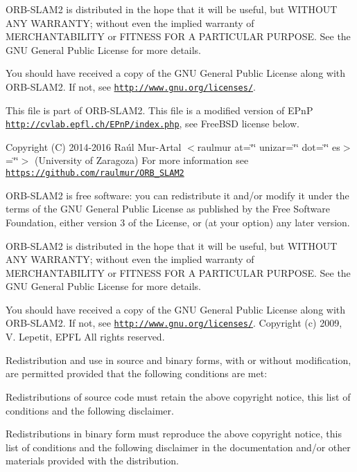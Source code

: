 O\+R\+B-\/\+S\+L\+A\+M2 is distributed in the hope that it will be useful, but W\+I\+T\+H\+O\+UT A\+NY W\+A\+R\+R\+A\+N\+TY; without even the implied warranty of M\+E\+R\+C\+H\+A\+N\+T\+A\+B\+I\+L\+I\+TY or F\+I\+T\+N\+E\+SS F\+OR A P\+A\+R\+T\+I\+C\+U\+L\+AR P\+U\+R\+P\+O\+SE. See the G\+NU General Public License for more details.

You should have received a copy of the G\+NU General Public License along with O\+R\+B-\/\+S\+L\+A\+M2. If not, see \href{http://www.gnu.org/licenses/}{\tt http\+://www.\+gnu.\+org/licenses/}.

This file is part of O\+R\+B-\/\+S\+L\+A\+M2. This file is a modified version of E\+PnP \href{http://cvlab.epfl.ch/EPnP/index.php}{\tt http\+://cvlab.\+epfl.\+ch/\+E\+Pn\+P/index.\+php}, see Free\+B\+SD license below.

Copyright (C) 2014-\/2016 Raúl Mur-\/\+Artal $<$raulmur at=\char`\"{}\char`\"{} unizar=\char`\"{}\char`\"{} dot=\char`\"{}\char`\"{} es$>$=\char`\"{}\char`\"{}$>$ (University of Zaragoza) For more information see \href{https://github.com/raulmur/ORB_SLAM2}{\tt https\+://github.\+com/raulmur/\+O\+R\+B\+\_\+\+S\+L\+A\+M2}

O\+R\+B-\/\+S\+L\+A\+M2 is free software\+: you can redistribute it and/or modify it under the terms of the G\+NU General Public License as published by the Free Software Foundation, either version 3 of the License, or (at your option) any later version.

O\+R\+B-\/\+S\+L\+A\+M2 is distributed in the hope that it will be useful, but W\+I\+T\+H\+O\+UT A\+NY W\+A\+R\+R\+A\+N\+TY; without even the implied warranty of M\+E\+R\+C\+H\+A\+N\+T\+A\+B\+I\+L\+I\+TY or F\+I\+T\+N\+E\+SS F\+OR A P\+A\+R\+T\+I\+C\+U\+L\+AR P\+U\+R\+P\+O\+SE. See the G\+NU General Public License for more details.

You should have received a copy of the G\+NU General Public License along with O\+R\+B-\/\+S\+L\+A\+M2. If not, see \href{http://www.gnu.org/licenses/}{\tt http\+://www.\+gnu.\+org/licenses/}. Copyright (c) 2009, V. Lepetit, E\+P\+FL All rights reserved.

Redistribution and use in source and binary forms, with or without modification, are permitted provided that the following conditions are met\+:


\begin{DoxyEnumerate}
\item Redistributions of source code must retain the above copyright notice, this list of conditions and the following disclaimer.
\item Redistributions in binary form must reproduce the above copyright notice, this list of conditions and the following disclaimer in the documentation and/or other materials provided with the distribution.
\end{DoxyEnumerate}

